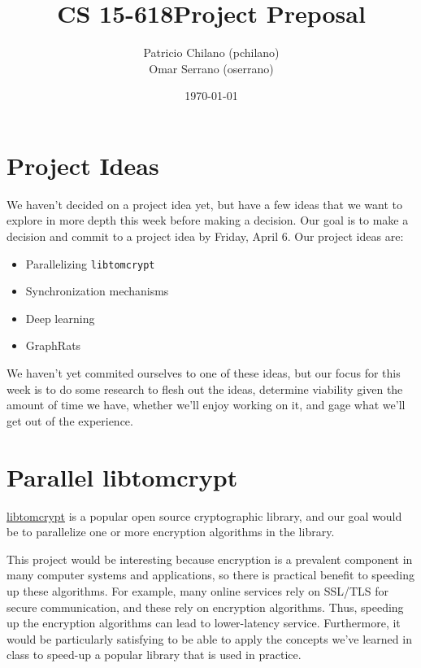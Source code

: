 \documentclass[11pt]{article} %
\title{\vspace{-25pt}
\huge CS 15-618\hfill Project Preposal}
\author{
    Patricio Chilano (pchilano) \\
    Omar Serrano (oserrano)
}
\date{\today}
\begin{document}


\maketitle

\section*{Project Ideas}

We haven't decided on a project idea yet, but have a few ideas that we want to
explore in more depth this week before making a decision. Our goal is to make a
decision and commit to a project idea by Friday, April 6. Our project ideas are:

\begin{itemize}
\item
Parallelizing \texttt{libtomcrypt}
\item
Synchronization mechanisms
\item
Deep learning
\item
GraphRats
\end{itemize}

We haven't yet commited ourselves to one of these ideas, but our focus for this
week is to do some research to flesh out the ideas, determine viability given
the amount of time we have, whether we'll enjoy working on it, and gage what
we'll get out of the experience.

\section*{Parallel libtomcrypt}

\href{https://github.com/libtom/libtomcrypt}{libtomcrypt} is a popular open
source cryptographic library, and our goal would be to parallelize one or more
encryption algorithms in the library.

This project would be interesting because encryption is a prevalent component in
many computer systems and applications, so there is practical benefit to
speeding up these algorithms. For example, many online services rely on SSL/TLS
for secure communication, and these rely on encryption algorithms. Thus,
speeding up the encryption algorithms can lead to lower-latency service.
Furthermore, it would be particularly satisfying to be able to apply the
concepts we've learned in class to speed-up a popular library that is used in
practice.
\end{document}
